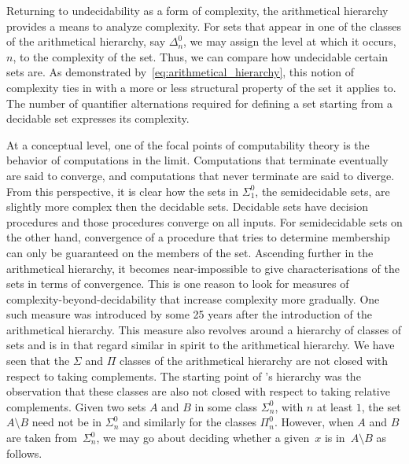 Returning to undecidability as a form of complexity, the arithmetical hierarchy provides a means to analyze complexity.
For sets that appear in one of the classes of the arithmetical hierarchy, say $\Delta^0_n$, we may assign the level at which it occurs, $n$, to the complexity of the set.
Thus, we can compare how undecidable certain sets are.
As demonstrated by~\eqref{eq:arithmetical_hierarchy}, this notion of complexity ties in with a more or less structural property of the set it applies to.
The number of quantifier alternations required for defining a set starting from a decidable set expresses its complexity.

At a conceptual level, one of the focal points of computability theory is the behavior of computations in the limit.
Computations that terminate eventually are said to converge, and computations that never terminate are said to diverge.
From this perspective, it is clear how the sets in $\Sigma^0_1$, the semidecidable sets, are slightly more complex then the decidable sets.
Decidable sets have decision procedures and those procedures converge on all inputs.
For semidecidable sets on the other hand, convergence of a procedure that tries to determine membership can only be guaranteed on the members of the set.
Ascending further in the arithmetical hierarchy, it becomes near-impossible to give characterisations of the sets in terms of convergence.
This is one reason to look for measures of complexity-beyond-decidability that increase complexity more gradually.
One such measure was introduced by \textcite{ershov1968hierarchyi} some 25 years after the introduction of the arithmetical hierarchy.
This measure also revolves around a hierarchy of classes of sets and is in that regard similar in spirit to the arithmetical hierarchy.
We have seen that the $\Sigma$ and $\Pi$ classes of the arithmetical hierarchy are not closed with respect to taking complements.
The starting point of \citeauthor{ershov1968hierarchyi}'s hierarchy was the observation that these classes are also not closed with respect to taking relative complements.
Given two sets $A$ and $B$ in some class $\Sigma^0_n$, with $n$ at least $1$, the set $A \setminus B$ need not be in $\Sigma^0_n$ and similarly for the classes $\Pi^0_n$.
However, when $A$ and $B$ are taken from~$\Sigma^0_n$, we may go about deciding whether a given~$x$ is in~$A \setminus B$ as follows.
